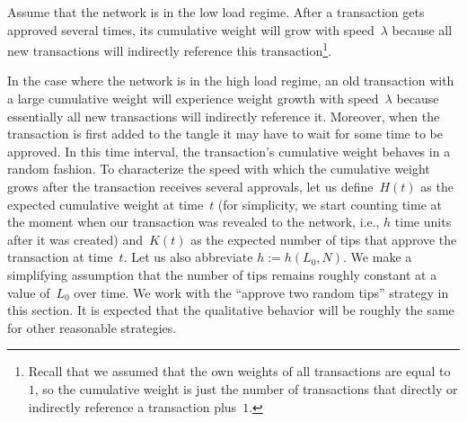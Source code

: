 \documentclass[12pt]{article}
\begin{document}
Assume that the network is in the low load regime. 
After a transaction gets approved several times, 
its cumulative weight will grow 
with speed~$\lambda$ 
because all new transactions
will indirectly reference this 
transaction\footnote{Recall that we assumed that
the own weights of all transactions are equal to~$1$,
so the cumulative weight is just the number of transactions
that directly or indirectly reference a transaction
plus~$1$.}.

In the case where the network is in the high load regime, an 
old transaction with a large cumulative weight will experience 
weight growth 
with speed~$\lambda$ 
because essentially 
all new transactions will indirectly reference it.
Moreover, when the transaction is first added to the tangle it may have 
to wait for some time to be approved. In this time interval, the 
transaction's cumulative weight behaves in a random fashion.
To characterize the speed with which the cumulative weight 
grows after the 
transaction receives several approvals, let us define~$H(t)$
 as the expected cumulative weight at time~$t$ 
(for simplicity, 
we start counting time at the moment when
 our transaction was revealed to the network, i.e.,
$h$ time units after it was created)
 and~$K(t)$ as the expected number of
 tips that approve the transaction at time~$t$.
Let us also abbreviate $h:=h(L_0,N)$. 
We make a simplifying
assumption that the number of tips remains roughly
constant at a value of~$L_0$ over time. 
We work with the ``approve two random tips'' strategy in this section. 
It is expected that the qualitative behavior will be roughly the same for 
other reasonable strategies. 
\end{document}
